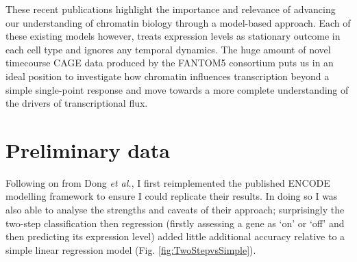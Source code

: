\documentclass[a4paper,10pt,oneside]{book}
\begin{document}
These recent publications highlight the importance and relevance of
advancing our understanding of chromatin biology through a model-based
approach. Each of these existing models however, treats expression
levels as stationary outcome in each cell type and ignores any temporal
dynamics. The huge amount of novel timecourse CAGE data 
produced by the FANTOM5 consortium\cite{fantom5} puts us in an ideal
position to investigate how chromatin influences transcription beyond a
simple single-point response and move towards a more complete
understanding of the drivers of transcriptional flux.


\section{Preliminary data}
Following on from Dong \emph{et al.},\cite{Dong2012} I first
reimplemented the published ENCODE modelling framework to ensure I could
replicate their results. In doing so I was also able to analyse the
strengths and caveats of their approach; surprisingly the two-step classification
then regression (firstly assessing a gene as `on' or `off' and then
predicting its expression level) added little additional accuracy relative to a simple
linear regression model 
(Fig. \ref{fig:TwoStepvsSimple}). \\
\end{document}
